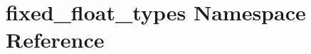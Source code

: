 \hypertarget{namespacefixed__float__types}{}\section{fixed\+\_\+float\+\_\+types Namespace Reference}
\label{namespacefixed__float__types}
